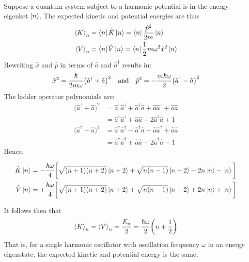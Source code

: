 \documentclass[nofootinbib,reprint,english]{revtex4-1}
\begin{document}
Suppose a quantum system subject to a harmonic potential is in the energy eigenket \(\ket{n}\). The expected kinetic and potential energies are thus
\begin{subequations}
\begin{align}
\expval{K}_n&=\bra{n}\hat{K}\ket{n}=\bra{n}\frac{\hat{p}^2}{2m}\ket{n}\\
\expval{V}_n&=\bra{n}\hat{V}\ket{n}=\bra{n}\frac{1}{2}m\omega^2\hat{x}^2\ket{n}
\end{align}
\end{subequations}
Rewriting \(\hat{x}\) and \(\hat{p}\) in terms of \(\hat{a}\) and \(\hat{a}^\dagger\) results in:
\[\hat{x}^2=\frac{\hbar}{2m\omega}\big(\hat{a}^\dagger+\hat{a}\big)^2\qand\hat{p}^2=-\frac{m\hbar\omega}{2}\big(\hat{a}^\dagger-\hat{a}\big)^2\]
The ladder operator polynomials are:
\begin{align*}
\big(\hat{a}^\dagger+\hat{a}\big)^2&=\hat{a}^\dagger\hat{a}^\dagger+\hat{a}^\dagger\hat{a}+\hat{a}\hat{a}^\dagger+\hat{a}\hat{a}\\
&=\hat{a}^\dagger\hat{a}^\dagger+\hat{a}\hat{a}+2\hat{a}^\dagger\hat{a}+1\\[0.25cm]
\big(\hat{a}^\dagger-\hat{a}\big)^2&=\hat{a}^\dagger\hat{a}^\dagger-\hat{a}^\dagger\hat{a}-\hat{a}\hat{a}^\dagger+\hat{a}\hat{a}\\
&=\hat{a}^\dagger\hat{a}^\dagger+\hat{a}\hat{a}-2\hat{a}^\dagger\hat{a}-1
\end{align*}
Hence,
\begin{widetext}
\begin{subequations}\label{eq:harmonic_oscillator_kinetic_and_potential_action}
\begin{align}
\hat{K}\ket{n}&=-\frac{\hbar\omega}{4}\bigg[\sqrt{(n+1)(n+2)}\ket{n+2}+\sqrt{n(n-1)}\ket{n-2}-2n\ket{n}-\ket{n}\bigg]\\
\hat{V}\ket{n}&=+\frac{\hbar\omega}{4}\bigg[\sqrt{(n+1)(n+2)}\ket{n+2}+\sqrt{n(n-1)}\ket{n-2}+2n\ket{n}+\ket{n}\bigg]
\end{align}
\end{subequations}
\end{widetext}
It follows then that
\begin{equation}
\expval{K}_n=\expval{V}_n=\frac{E_n}{2}=\frac{\hbar\omega}{2}\bigg(n+\frac{1}{2}\bigg)
\end{equation}
That is, for a single harmonic oscillator with oscillation frequency \(\omega\) in an energy eigenstate, the expected kinetic and potential energy is the same.
\end{document}
